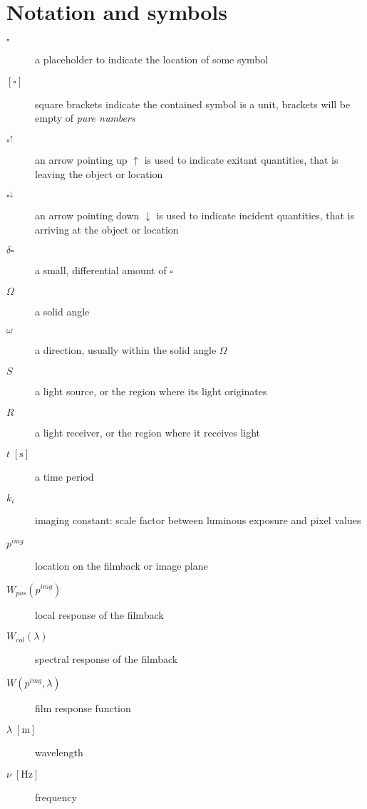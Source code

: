 
\chapter{Notation and symbols}\label{ch:notation}

\begin{description}
\item[ {$\square$} ] a placeholder to indicate the location of some symbol
\item[ {$[\square]$} ] square brackets indicate the contained symbol is a unit,
	brackets will be empty of \emph{pure numbers}
\item[ {$\square^\uparrow$} ] an arrow pointing up $\uparrow$ is used to indicate 
	exitant quantities, that is leaving the object or location
\item[ {$\square^\downarrow$} ] an arrow pointing down $\downarrow$ is used to indicate 
	incident quantities, that is arriving at the object or location

\item[ {$\delta\square$} ] a small, differential amount of $\square$

\item[{$\Omega$}] a solid angle
\item[{$\omega$}] a direction, usually within the solid angle $\Omega$
\item[$S$] a light source, or the region where its light originates
\item[$R$] a light receiver, or the region where it receives light
\item[ {$t\;[\unit\second]$} ] a time period
\item[$k_i$] imaging constant: scale factor between luminous exposure and pixel values
\item[$p^{img}$] location on the filmback or image plane
\item[$W_{pos}(p^{img})$] local response of the filmback
\item[$W_{col}(\lambda)$] spectral response of the filmback
\item[$W(p^{img},\lambda)$] film response function

\item[ {$\lambda\;[\unit\meter]$} ] wavelength
\item[ {$\nu\;[\unit\hertz]$} ] frequency


\end{description}
